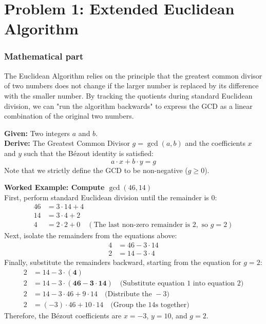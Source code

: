 \documentclass[11pt]{article}
\begin{document}
\section*{Problem 1: Extended Euclidean Algorithm}

\subsubsection*{Mathematical part}
The Euclidean Algorithm relies on the principle that the greatest common divisor of two numbers does not change if the larger number is replaced by its difference with the smaller number. By tracking the quotients during standard Euclidean division, we can "run the algorithm backwards" to express the GCD as a linear combination of the original two numbers.

\textbf{Given:} Two integers $a$ and $b$. \\
\textbf{Derive:} The Greatest Common Divisor $g = \gcd(a, b)$ and the coefficients $x$ and $y$ such that the Bézout identity is satisfied:
$$a \cdot x + b \cdot y = g$$
Note that we strictly define the GCD to be non-negative ($g \ge 0$).

\vspace{0.5cm}
\noindent\textbf{Worked Example: Compute $\gcd(46, 14)$} \\
First, perform standard Euclidean division until the remainder is $0$:
\begin{align*}
46 &= 3 \cdot 14 + 4 \\
14 &= 3 \cdot 4 + 2 \\
4 &= 2 \cdot 2 + 0 \quad (\text{The last non-zero remainder is } 2, \text{ so } g=2)
\end{align*}
Next, isolate the remainders from the equations above:
\begin{align}
4 &= 46 - 3 \cdot 14 \\
2 &= 14 - 3 \cdot 4
\end{align}
Finally, substitute the remainders backward, starting from the equation for $g=2$:
\begin{align*}
2 &= 14 - 3 \cdot (\mathbf{4}) \\
2 &= 14 - 3 \cdot (\mathbf{46 - 3 \cdot 14}) \quad \text{(Substitute equation 1 into equation 2)} \\
2 &= 14 - 3 \cdot 46 + 9 \cdot 14 \quad \text{(Distribute the }-3\text{)} \\
2 &= (-3) \cdot 46 + 10 \cdot 14 \quad \text{(Group the }14\text{s together)}
\end{align*}
Therefore, the Bézout coefficients are $x = -3$, $y = 10$, and $g = 2$.
\end{document}
